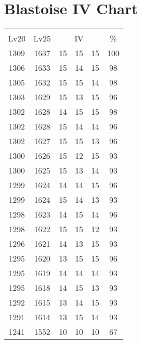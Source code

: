 \documentclass{article}%
\begin{document}
%
\normalsize%
\section{Blastoise IV Chart}%
\label{sec:Blastoise IV Chart}%
\renewcommand{\arraystretch}{1.5}%
\begin{tabular}{|c|c|c|c|c|c|}%
\hline%
\multicolumn{6}{|c|}{\textcolor{white}{ 
\linebreak{Blastoise}
}%
\cellcolor{black}}\\%
\multicolumn{1}{|c}{Lv20}&\multicolumn{1}{c|}{Lv25}&\multicolumn{3}{c|}{IV}&\multicolumn{1}{|c|}{\%}\\%
\hline%
\rowcolor{color100}%
1309&1637&15&15&15&100\\%
\hline%
\rowcolor{color98}%
1306&1633&15&14&15&98\\%
\hline%
\rowcolor{color98}%
1305&1632&15&15&14&98\\%
\hline%
\rowcolor{color96}%
1303&1629&15&13&15&96\\%
\hline%
\rowcolor{color98}%
1302&1628&14&15&15&98\\%
\hline%
\rowcolor{color96}%
1302&1628&15&14&14&96\\%
\hline%
\rowcolor{color96}%
1302&1627&15&15&13&96\\%
\hline%
\rowcolor{color93}%
1300&1626&15&12&15&93\\%
\hline%
\rowcolor{color93}%
1300&1625&15&13&14&93\\%
\hline%
\rowcolor{color96}%
1299&1624&14&14&15&96\\%
\hline%
\rowcolor{color93}%
1299&1624&15&14&13&93\\%
\hline%
\rowcolor{color96}%
1298&1623&14&15&14&96\\%
\hline%
\rowcolor{color93}%
1298&1622&15&15&12&93\\%
\hline%
\rowcolor{color93}%
1296&1621&14&13&15&93\\%
\hline%
\rowcolor{color96}%
1295&1620&13&15&15&96\\%
\hline%
\rowcolor{color93}%
1295&1619&14&14&14&93\\%
\hline%
\rowcolor{color93}%
1295&1618&14&15&13&93\\%
\hline%
\rowcolor{color93}%
1292&1615&13&14&15&93\\%
\hline%
\rowcolor{color93}%
1291&1614&13&15&14&93\\%
\hline%
\rowcolor{color91}%
1241&1552&10&10&10&67\\%
\end{tabular}

%
\end{document}
